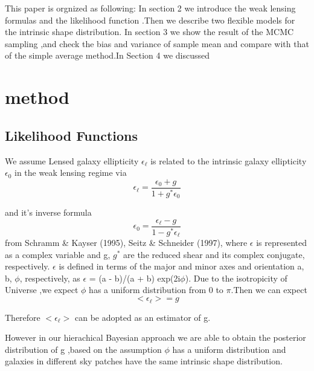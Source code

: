 \documentclass[useAMS,usenatbib]{mn2e}
\begin{document}
This paper is orgnized as following: In section 2 we introduce the
weak lensing formulas and the likelihood function .Then we describe
two flexible models for the intrinsic shape distribution. In section
3 we show the result of the MCMC sampling ,and check the bias and
variance of sample mean and compare with that of the simple average
method.In Section 4 we discussed




\section{method}

\label{sec:XXX}


\subsection{Likelihood Functions}

We assume Lensed galaxy ellipticity $\epsilon_{\ell}$ is related
to the intrinsic galaxy ellipticity $\epsilon_{0}$ in the weak lensing
regime via 
\begin{equation}
\epsilon_{\ell}=\frac{\epsilon_{0}+g}{1+g^{*}\epsilon_{0}}
\end{equation}


and it's inverse formula 
\begin{equation}
\epsilon_{0}=\frac{\epsilon_{\ell}-g}{1-g^{*}\epsilon_{\ell}}
\end{equation}
from Schramm \& Kayser (1995), Seitz \& Schneider (1997), where $\epsilon$
is represented as a complex variable and g, $g^{*}$ are the reduced
shear and its complex conjugate, respectively. $\epsilon$ is defined
in terms of the major and minor axes and orientation a, b, $\phi$,
respectively, as $\epsilon$ = (a - b)/(a + b) exp(2i$\phi$). Due
to the isotropicity of Universe ,we expect $\phi$ has a uniform distribution
from 0 to $\pi$.Then we can expect 
\begin{equation}
<\epsilon_{\ell}>=g
\end{equation}


Therefore $<\epsilon_{\ell}>$ can be adopted as an estimator of g.

However in our hierachical Bayesian approach we are able to obtain
the posterior distribution of g ,based on the assumption $\phi$ has
a uniform distribution and galaxies in different sky patches have
the same intrinsic shape distribution.
\end{document}

